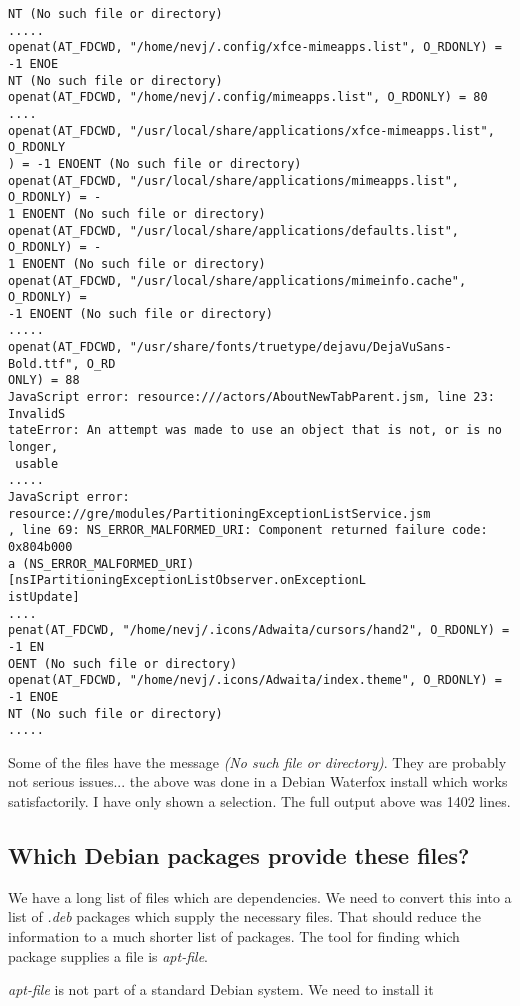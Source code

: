 \documentclass[a4paper]{article}  %
\begin{document}
\begin{tcolorbox}
\begin{verbatim}
NT (No such file or directory)
.....
openat(AT_FDCWD, "/home/nevj/.config/xfce-mimeapps.list", O_RDONLY) = -1 ENOE
NT (No such file or directory)
openat(AT_FDCWD, "/home/nevj/.config/mimeapps.list", O_RDONLY) = 80
....
openat(AT_FDCWD, "/usr/local/share/applications/xfce-mimeapps.list", O_RDONLY
) = -1 ENOENT (No such file or directory)
openat(AT_FDCWD, "/usr/local/share/applications/mimeapps.list", O_RDONLY) = -
1 ENOENT (No such file or directory)
openat(AT_FDCWD, "/usr/local/share/applications/defaults.list", O_RDONLY) = -
1 ENOENT (No such file or directory)
openat(AT_FDCWD, "/usr/local/share/applications/mimeinfo.cache", O_RDONLY) = 
-1 ENOENT (No such file or directory)
.....
openat(AT_FDCWD, "/usr/share/fonts/truetype/dejavu/DejaVuSans-Bold.ttf", O_RD
ONLY) = 88
JavaScript error: resource:///actors/AboutNewTabParent.jsm, line 23: InvalidS
tateError: An attempt was made to use an object that is not, or is no longer,
 usable
.....
JavaScript error: resource://gre/modules/PartitioningExceptionListService.jsm
, line 69: NS_ERROR_MALFORMED_URI: Component returned failure code: 0x804b000
a (NS_ERROR_MALFORMED_URI) [nsIPartitioningExceptionListObserver.onExceptionL
istUpdate]
....
penat(AT_FDCWD, "/home/nevj/.icons/Adwaita/cursors/hand2", O_RDONLY) = -1 EN
OENT (No such file or directory)
openat(AT_FDCWD, "/home/nevj/.icons/Adwaita/index.theme", O_RDONLY) = -1 ENOE
NT (No such file or directory)
.....
\end{verbatim}
\end{tcolorbox}
 Some of the files have the message {\em (No such file or directory)}. They are probably not serious issues... the above was done in a Debian Waterfox install which works satisfactorily. I have only shown a selection. The full output above was 1402 lines. 


\subsection{Which Debian packages provide these files?}
We have a long list of files which are dependencies. We need to convert this into a list of {\em .deb} packages which supply the necessary files.  That should reduce the information to a much shorter list of packages. The tool for finding which package supplies a file is {\em apt-file}.

{\em apt-file} is not part of a standard Debian system. We need to install it
\end{document}
